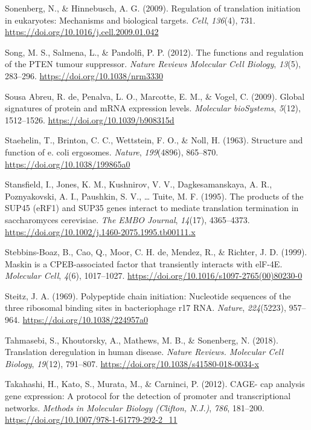 \documentclass[12pt,openany]{book}
\begin{document}
\hypertarget{ref-Sonenberg2009}{}
Sonenberg, N., \& Hinnebusch, A. G. (2009). Regulation of translation
initiation in eukaryotes: Mechanisms and biological targets.
\emph{Cell}, \emph{136}(4), 731.
\url{https://doi.org/10.1016/j.cell.2009.01.042}

\hypertarget{ref-Song2012}{}
Song, M. S., Salmena, L., \& Pandolfi, P. P. (2012). The functions and
regulation of the PTEN tumour suppressor. \emph{Nature Reviews Molecular
Cell Biology}, \emph{13}(5), 283--296.
\url{https://doi.org/10.1038/nrm3330}

\hypertarget{ref-deSousaAbreu2009}{}
Sousa Abreu, R. de, Penalva, L. O., Marcotte, E. M., \& Vogel, C.
(2009). Global signatures of protein and mRNA expression levels.
\emph{Molecular bioSystems}, \emph{5}(12), 1512--1526.
\url{https://doi.org/10.1039/b908315d}

\hypertarget{ref-Staehelin1963}{}
Staehelin, T., Brinton, C. C., Wettstein, F. O., \& Noll, H. (1963).
Structure and function of e. coli ergosomes. \emph{Nature},
\emph{199}(4896), 865--870. \url{https://doi.org/10.1038/199865a0}

\hypertarget{ref-Stansfield1995}{}
Stansfield, I., Jones, K. M., Kushnirov, V. V., Dagkesamanskaya, A. R.,
Poznyakovski, A. I., Paushkin, S. V., \ldots{} Tuite, M. F. (1995). The
products of the SUP45 (eRF1) and SUP35 genes interact to mediate
translation termination in saccharomyces cerevisiae. \emph{The EMBO
Journal}, \emph{14}(17), 4365--4373.
\url{https://doi.org/10.1002/j.1460-2075.1995.tb00111.x}

\hypertarget{ref-Stebbins-Boaz1999}{}
Stebbins-Boaz, B., Cao, Q., Moor, C. H. de, Mendez, R., \& Richter, J.
D. (1999). Maskin is a CPEB-associated factor that transiently interacts
with elF-4E. \emph{Molecular Cell}, \emph{4}(6), 1017--1027.
\url{https://doi.org/10.1016/s1097-2765(00)80230-0}

\hypertarget{ref-Steitz1969}{}
Steitz, J. A. (1969). Polypeptide chain initiation: Nucleotide sequences
of the three ribosomal binding sites in bacteriophage r17 RNA.
\emph{Nature}, \emph{224}(5223), 957--964.
\url{https://doi.org/10.1038/224957a0}

\hypertarget{ref-Tahmasebi2018}{}
Tahmasebi, S., Khoutorsky, A., Mathews, M. B., \& Sonenberg, N. (2018).
Translation deregulation in human disease. \emph{Nature Reviews.
Molecular Cell Biology}, \emph{19}(12), 791--807.
\url{https://doi.org/10.1038/s41580-018-0034-x}

\hypertarget{ref-Takahashi2012}{}
Takahashi, H., Kato, S., Murata, M., \& Carninci, P. (2012). CAGE- cap
analysis gene expression: A protocol for the detection of promoter and
transcriptional networks. \emph{Methods in Molecular Biology (Clifton,
N.J.)}, \emph{786}, 181--200.
\url{https://doi.org/10.1007/978-1-61779-292-2_11}
\end{document}
